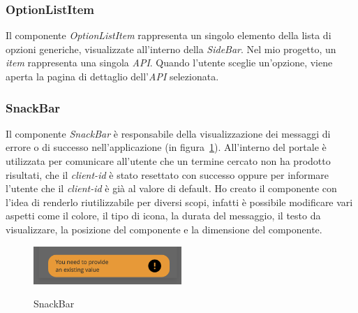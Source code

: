 \subsubsection{OptionListItem}\label{subsubsec:option-list-item}
Il componente \textit{OptionListItem} rappresenta un singolo elemento della lista di opzioni generiche, visualizzate all'interno della \textit{SideBar}. Nel mio progetto, un \textit{item} rappresenta una singola \textit{API}.
Quando l'utente sceglie un'opzione, viene aperta la pagina di dettaglio dell'\textit{API} selezionata.

\subsubsection{SnackBar}\label{subsubsec:snack-bar}
Il componente \textit{SnackBar} è responsabile della visualizzazione dei messaggi di errore o di successo nell'applicazione (in figura~\ref{fig:snack-bar}).
All'interno del portale è utilizzata per comunicare all'utente che un termine cercato non ha prodotto risultati, che il \textit{client-id} è stato resettato con successo
oppure per informare l'utente che il \textit{client-id} è già al valore di default.
Ho creato il componente con l'idea di renderlo riutilizzabile per diversi scopi, infatti è possibile modificare vari aspetti come il colore, il tipo di icona,
la durata del messaggio, il testo da visualizzare, la posizione del componente e la dimensione del componente.

\begin{figure}[ht]
  \centering
  \includegraphics[width=0.5\textwidth, alt={Snackbar di errore}]{images/frontend/SnackBar1.jpg}
  \caption{SnackBar}\label{fig:snack-bar}
\end{figure}

